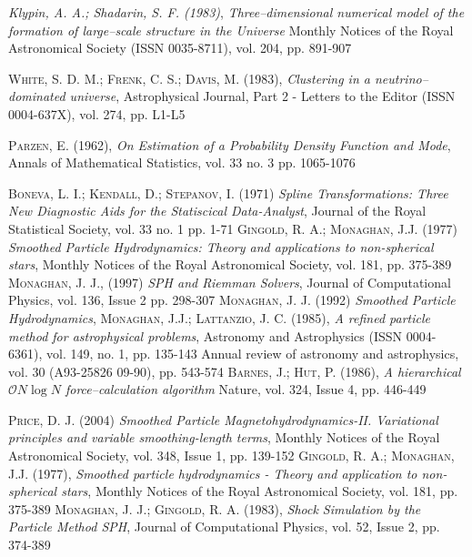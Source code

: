 \documentclass[a4paper,openright,12pt]{book}
\begin{document}
\begin{thebibliography}{a}
 \textit{Klypin, A. A.; Shadarin, S. F. (1983)},
\textit{Three--dimensional numerical model of the formation of large--scale structure in the Universe}
Monthly Notices of the Royal Astronomical Society (ISSN 0035-8711), vol. 204, pp. 891-907

 \textsc{White, S. D. M.; Frenk, C. S.; Davis, M. (1983)},
\textit{Clustering in a neutrino--dominated universe},
Astrophysical Journal, Part 2 - Letters to the Editor (ISSN 0004-637X), vol. 274, pp. L1-L5

 \textsc{Parzen, E. (1962)},
\textit{On Estimation of a Probability Density Function and Mode},
Annals of Mathematical Statistics, vol. 33 no. 3 pp. 1065-1076

 \textsc{Boneva, L. I.; Kendall, D.; Stepanov, I. (1971)}
\textit{Spline Transformations: Three New Diagnostic Aids for the Statiscical Data-Analyst},
Journal of the Royal Statistical Society, vol. 33 no. 1 pp. 1-71
 \textsc{Gingold, R. A.; Monaghan, J.J. (1977)}
\textit{Smoothed Particle Hydrodynamics: Theory and applications to non-spherical stars},
Monthly Notices of the Royal Astronomical Society, vol. 181, pp. 375-389
 \textsc{Monaghan, J. J., (1997)}
\textit{SPH and Riemman Solvers},
Journal of Computational Physics, vol. 136, Issue 2 pp. 298-307 
 \textsc{Monaghan, J. J. (1992)}
\textit{Smoothed Particle Hydrodynamics},
 \textsc{Monaghan, J.J.; Lattanzio, J. C. (1985)},
\textit{A refined particle method for astrophysical problems},
Astronomy and Astrophysics (ISSN 0004-6361), vol. 149, no. 1, pp. 135-143
Annual review of astronomy and astrophysics, vol. 30 (A93-25826 09-90), pp. 543-574
 \textsc{Barnes, J.; Hut, P. (1986)},
\textit{A hierarchical $\mathcal{O}N\log N$ force--calculation algorithm}
Nature, vol. 324, Issue 4, pp. 446-449

 \textsc{Price, D. J. (2004)}
\textit{Smoothed Particle Magnetohydrodynamics-II. Variational principles and variable smoothing-length terms},
Monthly Notices of the Royal Astronomical Society, vol. 348, Issue 1, pp. 139-152
 \textsc{Gingold, R. A.; Monaghan, J.J. (1977)},
\textit{Smoothed particle hydrodynamics - Theory and application to non-spherical stars},
Monthly Notices of the Royal Astronomical Society, vol. 181, pp. 375-389
 \textsc{Monaghan, J. J.; Gingold, R. A. (1983)},
\textit{Shock Simulation by the Particle Method SPH},
Journal of Computational Physics, vol. 52, Issue 2, pp. 374-389


\end{thebibliography}
\end{document}
